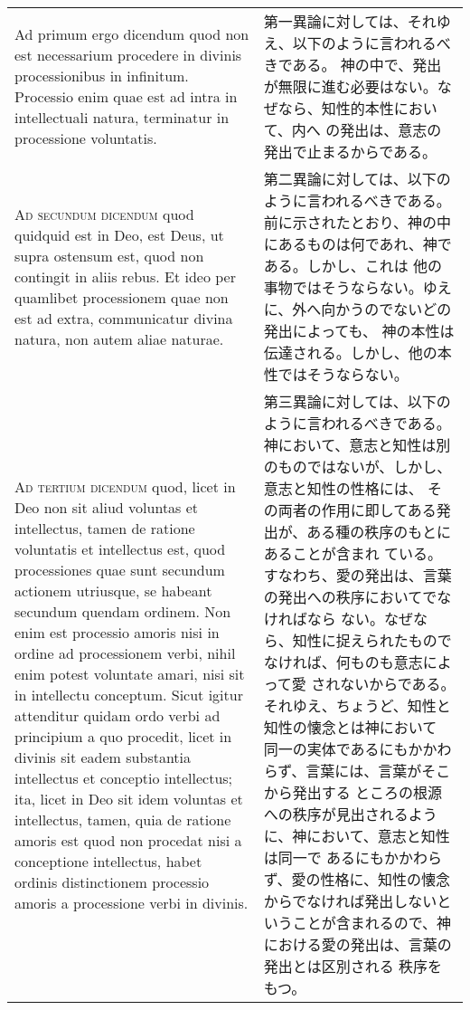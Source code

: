 \documentclass[10pt]{jsarticle} %
\begin{document}
\begin{longtable}{p{21em}p{21em}}
\\



Ad primum ergo dicendum quod non est necessarium procedere in divinis
processionibus in infinitum. Processio enim quae est ad intra in
intellectuali natura, terminatur in processione voluntatis.


&

第一異論に対しては、それゆえ、以下のように言われるべきである。
神の中で、発出が無限に進む必要はない。なぜなら、知性的本性において、内へ
 の発出は、意志の発出で止まるからである。


\\



{\scshape Ad secundum dicendum} quod quidquid est in Deo, est Deus, ut supra
ostensum est, quod non contingit in aliis rebus. Et ideo per quamlibet
processionem quae non est ad extra, communicatur divina natura, non
autem aliae naturae.


&

第二異論に対しては、以下のように言われるべきである。
前に示されたとおり、神の中にあるものは何であれ、神である。しかし、これは
 他の事物ではそうならない。ゆえに、外へ向かうのでないどの発出によっても、
 神の本性は伝達される。しかし、他の本性ではそうならない。


\\



{\scshape Ad tertium dicendum} quod, licet in Deo non sit aliud voluntas et
intellectus, tamen de ratione voluntatis et intellectus est, quod
processiones quae sunt secundum actionem utriusque, se habeant secundum
quendam ordinem. Non enim est processio amoris nisi in ordine ad
processionem verbi, nihil enim potest voluntate amari, nisi sit in
intellectu conceptum. Sicut igitur attenditur quidam ordo verbi ad
principium a quo procedit, licet in divinis sit eadem substantia
intellectus et conceptio intellectus; ita, licet in Deo sit idem
voluntas et intellectus, tamen, quia de ratione amoris est quod non
procedat nisi a conceptione intellectus, habet ordinis distinctionem
processio amoris a processione verbi in divinis.


&

第三異論に対しては、以下のように言われるべきである。
神において、意志と知性は別のものではないが、しかし、意志と知性の性格には、
 その両者の作用に即してある発出が、ある種の秩序のもとにあることが含まれ
 ている。すなわち、愛の発出は、言葉の発出への秩序においてでなければなら
 ない。なぜなら、知性に捉えられたものでなければ、何ものも意志によって愛
 されないからである。それゆえ、ちょうど、知性と知性の懐念とは神において
 同一の実体であるにもかかわらず、言葉には、言葉がそこから発出する
 ところの根源への秩序が見出されるように、神において、意志と知性は同一で
 あるにもかかわらず、愛の性格に、知性の懐念からでなければ発出しないと
 いうことが含まれるので、神における愛の発出は、言葉の発出とは区別される
 秩序をもつ。


\end{longtable}
\newpage
\end{document}
